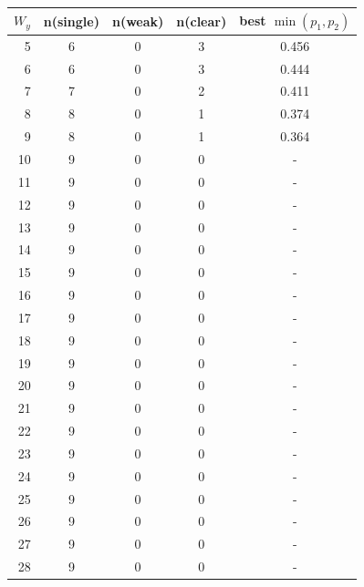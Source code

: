 \begin{tabular}{rcccc}
\toprule
$W_y$ & n(single) & n(weak) & n(clear) & best $\min(p_1,p_2)$ \\
\midrule
5 & 6 & 0 & 3 & 0.456 \\
6 & 6 & 0 & 3 & 0.444 \\
7 & 7 & 0 & 2 & 0.411 \\
8 & 8 & 0 & 1 & 0.374 \\
9 & 8 & 0 & 1 & 0.364 \\
10 & 9 & 0 & 0 & - \\
11 & 9 & 0 & 0 & - \\
12 & 9 & 0 & 0 & - \\
13 & 9 & 0 & 0 & - \\
14 & 9 & 0 & 0 & - \\
15 & 9 & 0 & 0 & - \\
16 & 9 & 0 & 0 & - \\
17 & 9 & 0 & 0 & - \\
18 & 9 & 0 & 0 & - \\
19 & 9 & 0 & 0 & - \\
20 & 9 & 0 & 0 & - \\
21 & 9 & 0 & 0 & - \\
22 & 9 & 0 & 0 & - \\
23 & 9 & 0 & 0 & - \\
24 & 9 & 0 & 0 & - \\
25 & 9 & 0 & 0 & - \\
26 & 9 & 0 & 0 & - \\
27 & 9 & 0 & 0 & - \\
28 & 9 & 0 & 0 & - \\
\bottomrule
\end{tabular}